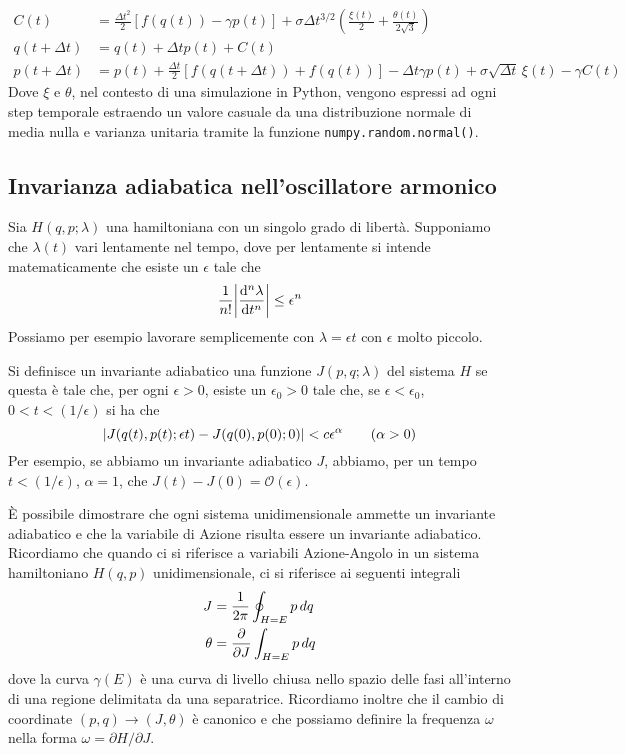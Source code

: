 \documentclass[10pt,a4paper]{article}
\begin{document}
\begin{align}
 	C(t) &= \frac{\Delta t^2}{2} [f(q(t)) - \gamma p(t)] + \sigma \Delta t^{3/2} \left(\frac{\xi(t)}{2} + \frac{\theta(t)}{2\sqrt{3}} \right) \\
 	q(t+\Delta t) &= q(t) + \Delta t p(t) + C(t) \\
 	p(t+\Delta t) &= p(t) + \frac{\Delta t}{2}[f(q(t+\Delta t)) + f(q(t))] - \Delta t \gamma p(t) + \sigma \sqrt{\Delta t}\,\xi(t) - \gamma C(t)
\end{align}
Dove \(\xi\) e \(\theta\), nel contesto di una simulazione in Python, vengono espressi ad ogni step temporale estraendo un valore casuale da una distribuzione normale di media nulla e varianza unitaria tramite la funzione \lstinline{numpy.random.normal()}.

\subsection{Invarianza adiabatica nell'oscillatore armonico}
Sia \(H(q,p;\lambda)\) una hamiltoniana con un singolo grado di libertà. Supponiamo che \(\lambda(t)\) vari lentamente nel tempo, dove per lentamente si intende matematicamente che esiste un \(\epsilon\) tale che
\begin{equation}
	\frac{1}{n!}\abs{\dv[n]{\lambda}{t}} \leq \epsilon^n
\end{equation}
Possiamo per esempio lavorare semplicemente con \(\lambda = \epsilon t\) con \(\epsilon\) molto piccolo.

Si definisce un invariante adiabatico una funzione \(J(p,q;\lambda)\) del sistema \(H\) se questa è tale che, per ogni \(\epsilon > 0\), esiste un \(\epsilon_0>0\) tale che, se \(\epsilon < \epsilon_0\), \(0<t<(1/\epsilon)\) si ha che
\begin{equation}
	\abs{J(q(t),p(t);\epsilon t) - J(q(0), p(0);0)}<c\epsilon^\alpha \quad\quad (\alpha > 0)
\end{equation}
Per esempio, se abbiamo un invariante adiabatico \(J\), abbiamo, per un tempo \(t<(1/\epsilon)\), \(\alpha=1\), che \(J(t)-J(0) = \mathcal{O}(\epsilon)\).

È possibile dimostrare che ogni sistema unidimensionale ammette un invariante adiabatico e che la variabile di Azione risulta essere un invariante adiabatico. Ricordiamo che quando ci si riferisce a variabili Azione-Angolo in un sistema hamiltoniano \(H(q,p)\) unidimensionale, ci si riferisce ai seguenti integrali
\begin{align}
	J &= \frac{1}{2\pi} \oint_{H=E} p\,dq \\
	\theta &= \pdv{}{J} \int_{H=E} p\,dq
\end{align}
dove la curva \(\gamma(E)\) è una curva di livello chiusa nello spazio delle fasi all'interno di una regione delimitata da una separatrice. Ricordiamo inoltre che il cambio di coordinate \((p,q)\to(J,\theta)\) è canonico e che possiamo definire la frequenza \(\omega\) nella forma \(\omega = \partial H / \partial J\).
\end{document}

